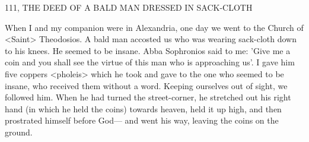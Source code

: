 111, THE DEED OF A BALD MAN
DRESSED IN SACK-CLOTH

When I and my companion were in Alexandria, one day we went to
the Church of <Saint> Theodosios.
A bald man accosted us who
was wearing sack-cloth down to his knees.
He seemed to be insane.
Abba Sophronios said to me: 'Give me a coin and you shall see the
virtue of this man who is approaching us'.
I gave him five coppers
<pholeis> which he took and gave to the one who seemed to be
insane, who received them without a word.
Keeping ourselves out
of sight, we followed him.
When he had turned the street-corner, he
stretched out his right hand (in which he held the coins) towards
heaven, held it up high, and then prostrated himself before God—
and went his way, leaving the coins on the ground.

